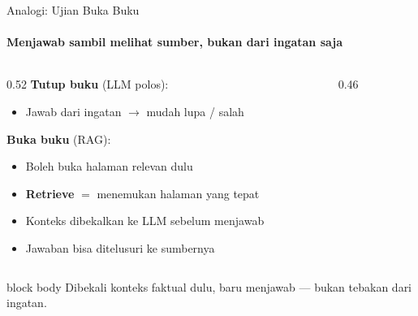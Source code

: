 \documentclass[aspectratio=169,t]{beamer}
\newcommand{\takeaway}[1]{%
  \vspace{0.3em}
  \begin{beamercolorbox}[rounded=true,shadow=false,sep=6pt]{block body}
    \centering\small\color{nvlightgreen}#1
  \end{beamercolorbox}%
}
\begin{document}
\begin{frame}{Analogi: Ujian Buka Buku}
  \framesubtitle{Menjawab sambil melihat sumber, bukan dari ingatan saja}
  \begin{columns}[T]
    \begin{column}{0.52\textwidth}
      \textcolor{nvred}{\textbf{Tutup buku}} (LLM polos):
      \begin{itemize}\footnotesize
        \item Jawab dari ingatan $\to$ mudah lupa / salah
      \end{itemize}
      \vspace{0.3em}
      \textcolor{nvgreen}{\textbf{Buka buku}} (RAG):
      \begin{itemize}\footnotesize
        \item Boleh buka halaman relevan dulu
        \item \textbf{Retrieve} $=$ menemukan halaman yang tepat
        \item Konteks dibekalkan ke LLM sebelum menjawab
        \item Jawaban bisa ditelusuri ke sumbernya
      \end{itemize}
    \end{column}
    \begin{column}{0.46\textwidth}
      \begin{center}
      \end{center}
    \end{column}
  \end{columns}
  \takeaway{Dibekali konteks faktual dulu, baru menjawab --- bukan tebakan dari ingatan.}
\end{frame}
\end{document}
